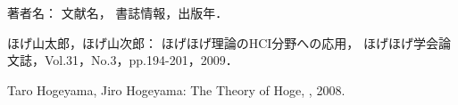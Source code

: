 
\begin{bib}[100]

\begin{thebibliography}{}

    著者名： 
    \newblock 文献名，
    \newblock 書誌情報，出版年．

   ほげ山太郎，ほげ山次郎：
   \newblock ほげほげ理論のHCI分野への応用，
   \newblock ほげほげ学会論文誌，Vol.31，No.3，pp.194-201，2009．
 
   Taro Hogeyama, Jiro Hogeyama:
   \newblock The Theory of Hoge,
   , 2008.
	
\end{thebibliography}

\end{bib}